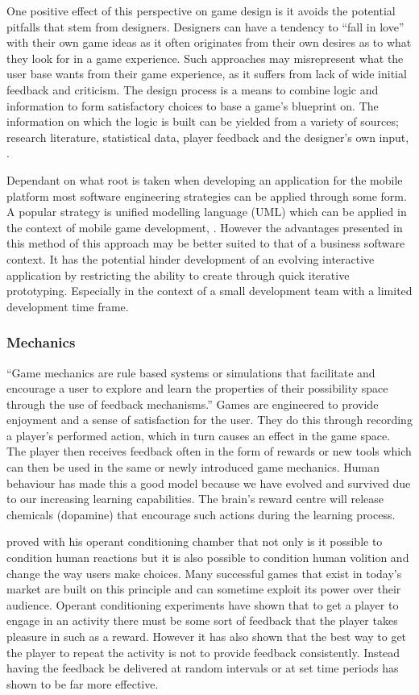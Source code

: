 \documentclass[final]{cmpreport}
\begin{document}
One positive effect of this perspective on game design is it avoids the potential pitfalls that stem from designers. Designers can have a tendency to ``fall in love'' with their own game ideas as it often originates from their own desires as to what they look for in a game experience. Such approaches may misrepresent what the user base wants from their game experience, as it suffers from lack of wide initial feedback and criticism. The design process is a means to combine logic and information to form satisfactory choices to base a game's blueprint on. The information on which the logic is built can be yielded from a variety of sources; research literature, statistical data, player feedback and the designer's own input, \cite{ErmiMayra}.

Dependant on what root is taken when developing an application for the mobile platform most software engineering strategies can be applied through some form. A popular strategy is unified modelling language (UML) which can be applied in the context of mobile game development, \cite{UML}. However the advantages presented in this method of this approach may be better suited to that of a business software context. It has the potential hinder development of an evolving interactive application by restricting the ability to create through quick iterative prototyping. Especially in the context of a small development team with a limited development time frame.


\subsubsection{Mechanics}
``Game mechanics are rule based systems or simulations that facilitate and encourage a user to explore and learn the properties of their possibility space through the use of feedback mechanisms.''\cite{Koster} Games are engineered to provide enjoyment and a sense of satisfaction for the user. They do this through recording a player's performed action, which in turn causes an effect in the game space. The player then receives feedback often in the form of rewards or new tools which can then be used in the same or newly introduced game mechanics. Human behaviour has made this a good model because we have evolved and survived due to our increasing learning capabilities. The brain's reward centre will release chemicals (dopamine) that encourage such actions during the learning process.

\cite{Skinner} proved with his operant conditioning chamber that not only is it possible to condition human reactions but it is also possible to condition human volition and change the way users make choices. Many successful games that exist in today's market are built on this principle and can sometime exploit its power over their audience. Operant conditioning experiments have shown that to get a player to engage in an activity there must be some sort of feedback that the player takes pleasure in such as a reward. However it has also shown that the best way to get the player to repeat the activity is not to provide feedback consistently. Instead having the feedback be delivered at random intervals or at set time periods has shown to be far more effective.
\end{document}
